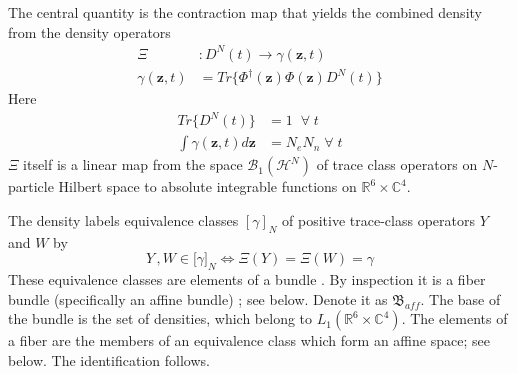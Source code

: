 \documentclass[aps,preprint]{revtex4}%
\begin{document}
The central quantity is the contraction map that yields the combined density
from the density operators
\begin{align}
\Xi &  :D^{N}(t)\rightarrow\gamma(\mathbf{z},t)\nonumber\\
\gamma(\mathbf{z},t)  &  =Tr\{\Phi^{\dagger}(\mathbf{z})\Phi(\mathbf{z}%
)D^{N}(t)\} \label{Xidefn}%
\end{align}
Here
\begin{align}
Tr\{D^{N}(t)\}  &  =1\;\;\forall\;t\nonumber\\
\int\gamma(\mathbf{z},t)d\mathbf{z}  &  =N_{e}N_{n}\;\forall\;t
\end{align}
$\Xi$ itself is a linear map from the space $\mathcal{B}_{1}(\mathcal{H}^{N})$
of trace class operators on $N$-particle Hilbert space to absolute integrable
functions on $\mathbb{R}^{6}\times\mathbb{C}^{4}$.

The density labels equivalence classes $[\gamma]_{N}$ of positive trace-class
operators $Y$ and $W$ by
\begin{equation}
Y\,,W\in\lbrack\gamma]_{N}\Leftrightarrow\Xi(Y)=\Xi(W)=\gamma
\end{equation}
These equivalence classes are elements of a bundle \cite{Bruhat}. By
inspection it is a fiber bundle (specifically an affine bundle)
\cite{affinebundleref}; see below. Denote it as $\mathfrak{B}_{aff}$. The base
of the bundle is the set of densities, which belong to $L_{1}(\mathbb{R}%
^{6}\times\mathbb{C}^{4})$. The elements of a fiber are the members of an
equivalence class which form an affine space; see below. The identification follows.
\end{document}
